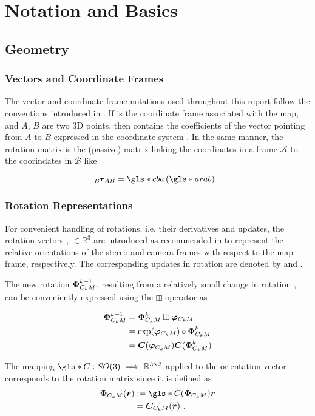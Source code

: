 \chapter{Notation and Basics}
\section{Geometry}
\subsection{Vectors and Coordinate Frames}

The vector and coordinate frame notations used throughout this report follow the
conventions introduced in \cite{coordinates}.
If  is the coordinate frame associated with the map, and $A$, $B$ are two 
3D points, then  contains the coefficients of the vector pointing from
$A$ to $B$ expressed in the coordinate system .
In the same manner, the rotation matrix  is the (passive) matrix linking
the coordinates in a frame $\mathcal{A}$ to the coorindates in $\mathcal{B}$ like

\begin{equation}
  \brab = \g{cba} \left( \g{arab} \right) \text{ .}
\end{equation}

\subsection{Rotation Representations}

For convenient handling of rotations, i.e. their derivatives and updates, the
rotation vectors \Phic, \Phis $\in\mathbb{R}^3$ are introduced as recommended in 
\cite{Primer} to represent the relative orientations of the stereo and camera
frames with respect to the map frame, respectively. The corresponding updates in
rotation are denoted by \phic and \phis.

The new rotation $\bm{\Phi}_{C_kM}^{k+1}$, resulting from a relatively small change in
rotation \phic, can be conveniently expressed using the $\boxplus$-operator as

\begin{align}
  \bm{\Phi}_{C_kM}^{k+1} &= \bm{\Phi}_{C_kM}^k \boxplus \bm{\varphi}_{C_kM} \\
  &= \text{exp}(\bm{\varphi}_{C_kM}) \circ \bm{\Phi}_{C_kM}^k \\
  &= \bm{C}(\bm{\varphi}_{C_kM}) \bm{C}(\bm{\Phi}_{C_kM}^k)  
\end{align}

The mapping $\g{C} : SO(3) \implies \mathbb{R}^{3\times3}$ applied to the
orientation vector \Phic corresponds to the rotation matrix \rotcm since it is
defined as
\begin{align}
  \Phic(\vc{r}) &:= \g{C}(\Phic)\vc{r} \\
  &= \rotcm(\vc{r})
  \label{eq:basics-rotation} \text{ .}
\end{align}

